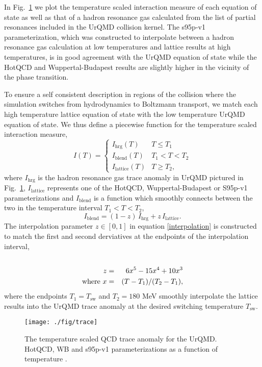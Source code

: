 \documentclass[aps,prc,reprint,amsmath,nofootinbib,superscriptaddress]{revtex4-1}
\begin{document}
In Fig.~\ref{fig:trace} we plot the temperature scaled interaction measure of each equation of state as well as that of a hadron resonance gas calculated from 
the list of partial resonances included in the UrQMD collision kernel. The s95p-v1 parameterization, which was constructed to interpolate between 
a hadron resonance gas calculation at low temperatures and lattice results at high temperatures, is in good agreement with the UrQMD equation of state while the 
HotQCD and Wuppertal-Budapest results are slightly higher in the vicinity of the phase transition.

To ensure a self consistent description in regions of the collision where the simulation switches from hydrodynamics to Boltzmann transport, we match each high 
temperature lattice equation of state with the low temperature UrQMD equation of state. We thus define a piecewise function for the temperature scaled interaction measure,
\begin{equation}
 \label{interaction}
 I(T) =
  \begin{cases}
   I_\text{hrg}(T)	& T \le T_1 \\
   I_\text{blend}(T)	& T_1 < T < T_2 \\ 
   I_\text{lattice}(T)	& T \ge T_2,
  \end{cases}
\end{equation}
where $I_\text{hrg}$ is the hadron resonance gas trace anomaly in UrQMD pictured in Fig.~\ref{fig:trace}, $I_\text{lattice}$ represents one of the HotQCD, Wuppertal-Budapest or S95p-v1 
parameterizations and $I_\text{blend}$ is a function which smoothly connects between the two in the temperature interval $T_1 < T < T_2$,
\begin{equation}
  \label{interpolation}
  I_\text{blend} = (1-z)\, I_\text{hrg} + z\, I_\text{lattice}.
\end{equation}
The interpolation parameter $z \in [0,1]$ in equation \ref{interpolation} is constructed to match the first and second derviatives at the endpoints of the 
interpolation interval,
\begin{eqnarray}
 \label{smoothstep}
 \cr z &=& 6 x^5 - 15 x^4 + 10 x^3 \\
  \text{where } x &=& (T - T_1)/(T_2 - T_1),
\end{eqnarray}
where the endpoints $T_1 = T_\text{sw}$ and $T_2 = 180$ MeV smoothly interpolate the lattice results into the UrQMD trace anomaly at the desired switching 
temperature $T_\text{sw}$.

\begin{figure}[t]
  \texttt{[image: ./fig/trace]}
  \caption{\label{fig:trace} The temperature scaled QCD trace anomaly for the UrQMD. HotQCD, WB and s95p-v1 parameterizations as a function of temperature \cite{?}.}
\end{figure}
\end{document}
